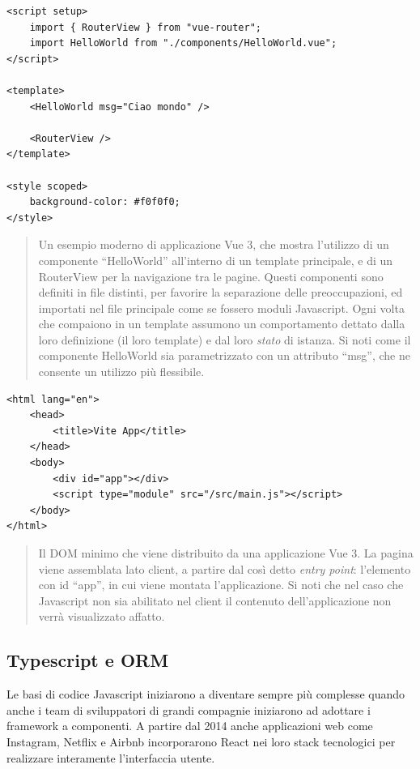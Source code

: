 \begin{verbatim}
<script setup>
    import { RouterView } from "vue-router";
    import HelloWorld from "./components/HelloWorld.vue";
</script>

<template>
    <HelloWorld msg="Ciao mondo" />

    <RouterView />
</template>

<style scoped>
    background-color: #f0f0f0;
</style>
\end{verbatim}

\begin{quote}
Un esempio moderno di applicazione Vue 3, che mostra l'utilizzo di un
componente ``HelloWorld'' all'interno di un template principale, e di un
RouterView per la navigazione tra le pagine. Questi componenti sono
definiti in file distinti, per favorire la separazione delle
preoccupazioni, ed importati nel file principale come se fossero moduli
Javascript. Ogni volta che compaiono in un template assumono un
comportamento dettato dalla loro definizione (il loro template) e dal
loro \emph{stato} di istanza. Si noti come il componente HelloWorld sia
parametrizzato con un attributo ``msg'', che ne consente un utilizzo più
flessibile.
\end{quote}

\begin{verbatim}
<html lang="en">
    <head>
        <title>Vite App</title>
    </head>
    <body>
        <div id="app"></div>
        <script type="module" src="/src/main.js"></script>
    </body>
</html>
\end{verbatim}

\begin{quote}
Il DOM minimo che viene distribuito da una applicazione Vue 3. La pagina
viene assemblata lato client, a partire dal così detto \emph{entry
point}: l'elemento con id ``app'', in cui viene montata l'applicazione.
Si noti che nel caso che Javascript non sia abilitato nel client il
contenuto dell'applicazione non verrà visualizzato affatto.
\end{quote}

\subsection{Typescript e ORM}\label{typescript-e-orm}

Le basi di codice Javascript iniziarono a diventare sempre più complesse
quando anche i team di sviluppatori di grandi compagnie iniziarono ad
adottare i framework a componenti. A partire dal 2014 anche applicazioni
web come Instagram, Netflix e Airbnb incorporarono React nei loro stack
tecnologici per realizzare interamente l'interfaccia utente.

